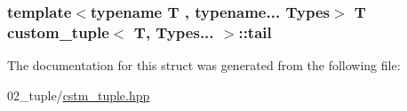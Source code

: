\subsubsection[{\texorpdfstring{tail}{tail}}]{\setlength{\rightskip}{0pt plus 5cm}template$<$typename T , typename... Types$>$ T {\bf custom\+\_\+tuple}$<$ T, Types... $>$\+::tail}\hypertarget{structcustom__tuple_3_01T_00_01Types_8_8_8_01_4_adff61bc9ff136d4c8393278eef6b62b4}{}\label{structcustom__tuple_3_01T_00_01Types_8_8_8_01_4_adff61bc9ff136d4c8393278eef6b62b4}


The documentation for this struct was generated from the following file\+:\begin{DoxyCompactItemize}
\item 
02\+\_\+tuple/\hyperlink{cstm__tuple_8hpp}{cstm\+\_\+tuple.\+hpp}\end{DoxyCompactItemize}
